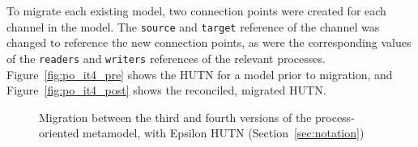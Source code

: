 To migrate each existing model, two connection points were created for each channel in the model. The \texttt{s\-ou\-r\-ce} and \texttt{ta\-rg\-et} reference of the channel was changed to reference the new connection points, as were the corresponding values of the \texttt{re\-ad\-e\-rs} and \texttt{wr\-it\-e\-rs} references of the relevant processes. Figure~\ref{fig:po_it4_pre} shows the HUTN for a model prior to migration, and Figure~\ref{fig:po_it4_post} shows the reconciled, migrated HUTN.

\begin{figure}[htbp]
	\centering
	\caption{Migration between the third and fourth versions of the process-oriented metamodel, with Epsilon HUTN (Section~\ref{sec:notation})}
\end{figure}

